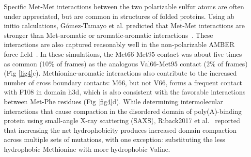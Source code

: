 \documentclass[10pt,letterpaper]{article}
\begin{document}
Specific Met-Met interactions between the two polarizable sulfur atoms are often under appreciated, but are common in structures of folded proteins\cite{Faure2008}. Using ab initio calculations, G\'omez-Tamayo et al. predicted that Met-Met interactions are stronger than Met-aromatic or aromatic-aromatic interactions~\cite{Gomez-Tamayo2016}. These interactions are also captured reasonably well in the non-polarizable AMBER force field~\cite{Gomez-Tamayo2016}. In these simulations, the Met66-Met95 contact was about five times as common (10\% of frames) as the analogous Val66-Met95 contact (2\% of frames) (Fig \ref{fig4}c). Methionine-aromatic interactions also contribute to the increased number of cross boundary contacts: M66, but not V66, forms a frequent contact with F108 in domain h3d, which is also consistent with the favorable interactions between Met-Phe residues\cite{Viguera1995,Faure2008,Valley2012} (Fig \ref{fig4}d). While determining intermolecular interactions that cause compaction in the disordered domain of poly(A)-binding protein using small-angle X-ray scattering (SAXS), Riback2017 et al.~\cite{Riback2017} reported that increasing the net hydrophobicity produces increased domain compaction across multiple sets of mutations, with one exception: substituting the less hydrophobic Methionine with more hydrophobic Valine. 


\end{document}
